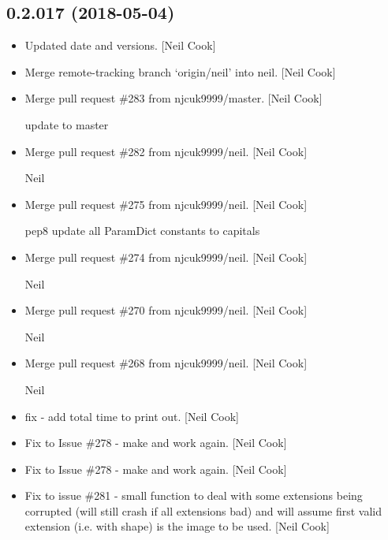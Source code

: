 \documentclass[a4paper,10pt,english]{report}
\begin{document}
\subsection{0.2.017 (2018-05-04)}
\label{\detokenize{misc/changelog:id444}}\begin{itemize}
\item {} 
Updated date and versions. {[}Neil Cook{]}

\item {} 
Merge remote-tracking branch ‘origin/neil’ into neil. {[}Neil Cook{]}

\item {} 
Merge pull request \#283 from njcuk9999/master. {[}Neil Cook{]}

update to master

\item {} 
Merge pull request \#282 from njcuk9999/neil. {[}Neil Cook{]}

Neil

\item {} 
Merge pull request \#275 from njcuk9999/neil. {[}Neil Cook{]}

pep8 update all ParamDict constants to capitals

\item {} 
Merge pull request \#274 from njcuk9999/neil. {[}Neil Cook{]}

Neil

\item {} 
Merge pull request \#270 from njcuk9999/neil. {[}Neil Cook{]}

Neil

\item {} 
Merge pull request \#268 from njcuk9999/neil. {[}Neil Cook{]}

Neil

\item {} 
 fix - add total time to  print out. {[}Neil Cook{]}

\item {} 
Fix to Issue \#278 - make  and
 work again. {[}Neil Cook{]}

\item {} 
Fix to Issue \#278 - make  and
 work again. {[}Neil Cook{]}

\item {} 
Fix to issue \#281 - small function to deal with some extensions being
corrupted (will still crash if all extensions bad) and will assume
first valid extension (i.e. with shape) is the image to be used. {[}Neil
Cook{]}


\end{itemize}
\end{document}
